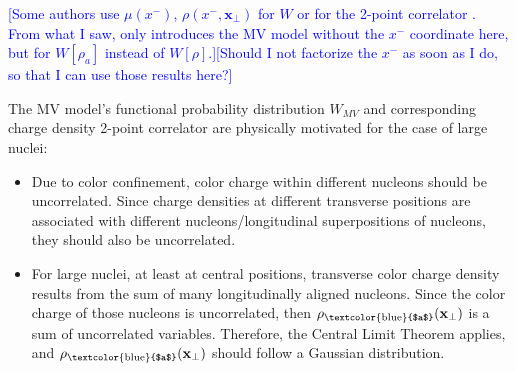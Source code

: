 
\textcolor{blue}{[Some authors use $\mu(x^-)$, $\rho(x^-, \mathbf{x}_\perp)$ for $W$ \citep{Albacete_2014} or for the 2-point correlator \cite{Lappi_notes}. From what I saw, only \cite{Gelis_Habilitation} introduces the MV model without the $x^-$ coordinate here, but for $W[\rho_a]$ instead of $W[\rho]$.][Should I not factorize the $x^-$ as soon as I do, so that I can use those results here?]}

The \gls{MV} model's functional probability distribution $W_{MV}$ and corresponding charge density 2-point correlator are physically motivated for the case of large nuclei: \citep{Gelis_habilitation}
\begin{itemize}
	\item[1)] Due to color confinement, color charge within different nucleons should be uncorrelated. Since charge densities at different transverse positions are associated with different nucleons/longitudinal superpositions of nucleons, they should also be uncorrelated.
	\item[2)] For large nuclei, at least at central positions, transverse color charge density results from the sum of many longitudinally aligned nucleons. Since the color charge of those nucleons is uncorrelated, then $\rho_\text{\textcolor{blue}{$a$}}(\mathbf{x}_\perp)$ is a sum of uncorrelated variables. Therefore, the Central Limit Theorem applies, and $\rho_\text{\textcolor{blue}{$a$}}(\mathbf{x}_\perp)$ should follow a Gaussian distribution.
\end{itemize}








